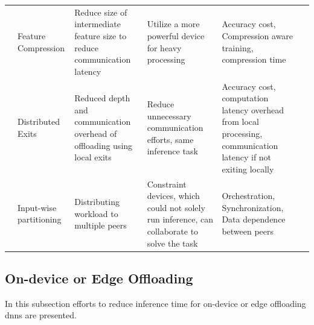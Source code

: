 \begin{minipage}[t]{\linewidth}
\begin{tiny}
\begin{longtabu}{>{\bfseries}X[0.8c]|X[c]|X[c]|X[c]|X[c]|X[c]}
	 & Feature Compression & Reduce size of intermediate feature size to reduce communication latency & Utilize a more powerful device for heavy processing  & Accuracy cost, Compression aware training, compression time & \cite{kang_neurosurgeon:_2017,choi_near-lossless_2018, choi_deep_2018, eshratifar_bottlenet:_2019} \tabularnewline
	
	& Distributed Exits & Reduced depth and communication overhead of offloading using local exits  &  Reduce unnecessary communication efforts, same inference task & Accuracy cost, computation latency overhead from local processing, communication latency if not exiting locally & \cite{leroux_cascading_2017,teerapittayanon_distributed_2017, li_edge_2018} \tabularnewline\hline
	
	 & Input-wise partitioning & Distributing workload to multiple peers & Constraint devices, which could not solely run inference, can collaborate to solve the task & Orchestration, Synchronization, Data dependence between peers & \cite{mao_modnn:_2017, zhao_deepthings:_2018}
	\tabularnewline

	\bottomrule
\end{longtabu}
\end{tiny}
\end{minipage}

\subsection{On-device or Edge Offloading}

In this subsection efforts to reduce inference time for on-device or edge offloading \gls{dnn}s are presented.

